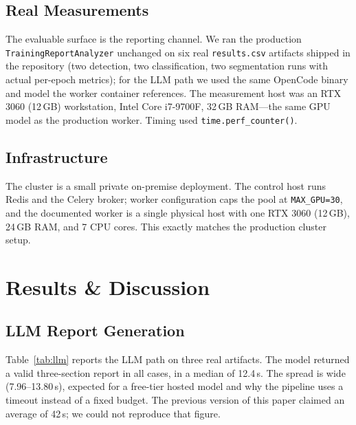 \documentclass[10pt,twocolumn,letterpaper]{article}
\begin{document}
\subsection{Real Measurements}
The evaluable surface is the reporting channel. We ran the production \texttt{TrainingReportAnalyzer} unchanged on six real \texttt{results.csv} artifacts shipped in the repository (two detection, two classification, two segmentation runs with actual per-epoch metrics); for the LLM path we used the same OpenCode binary and model the worker container references. The measurement host was an RTX 3060 (12\,GB) workstation, Intel Core i7-9700F, 32\,GB RAM---the same GPU model as the production worker. Timing used \texttt{time.perf\_counter()}.

\subsection{Infrastructure}
The cluster is a small private on-premise deployment. The control host runs Redis and the Celery broker; worker configuration caps the pool at \texttt{MAX\_GPU=30}, and the documented worker is a single physical host with one RTX 3060 (12\,GB), 24\,GB RAM, and 7 CPU cores. This exactly matches the production cluster setup.

\section{Results \& Discussion}
\subsection{LLM Report Generation}
Table~\ref{tab:llm} reports the LLM path on three real artifacts. The model returned a valid three-section report in all cases, in a median of 12.4\,s. The spread is wide (7.96--13.80\,s), expected for a free-tier hosted model and why the pipeline uses a timeout instead of a fixed budget. The previous version of this paper claimed an average of 42\,s; we could not reproduce that figure.

\begin{table}[htbp]
\centering
\caption{LLM report generation on real \texttt{results.csv} artifacts (production prompt)}
\label{tab:llm}
\end{table}
\end{document}
